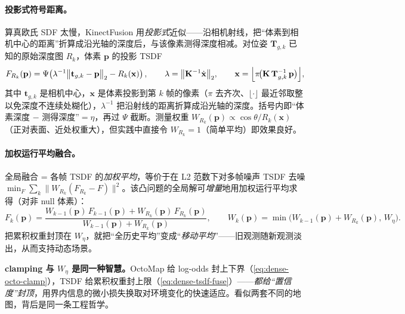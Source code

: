 \paragraph{投影式符号距离。}
算真欧氏 SDF 太慢，KinectFusion 用\emph{投影式}近似——沿相机射线，把“体素到相机中心的距离”折算成沿光轴的深度后，与该像素测得深度相减。对位姿 $\mathbf{T}_{g,k}$ 已知的原始深度图 $R_k$，体素 $\mathbf{p}$ 的投影 TSDF
\begin{equation}
  F_{R_k}(\mathbf{p})=\Psi\!\left(\lambda^{-1}\bigl\|\mathbf{t}_{g,k}-\mathbf{p}\bigr\|_2-R_k(\mathbf{x})\right),\qquad
  \lambda=\bigl\|\mathbf{K}^{-1}\dot{\mathbf{x}}\bigr\|_2,\qquad
  \mathbf{x}=\Bigl\lfloor \pi\!\bigl(\mathbf{K}\,\mathbf{T}_{g,k}^{-1}\,\mathbf{p}\bigr)\Bigr\rfloor,
  \label{eq:dense-tsdf-proj}
\end{equation}
其中 $\mathbf{t}_{g,k}$ 是相机中心，$\mathbf{x}$ 是体素投影到第 $k$ 帧的像素（$\pi$ 去齐次、$\lfloor\cdot\rfloor$ 最近邻取整以免深度不连续处糊化），$\lambda^{-1}$ 把沿射线的距离折算成沿光轴的深度。括号内即“体素深度 $-$ 测得深度”$=\eta$，再过 $\Psi$ 截断。测量权重 $W_{R_k}(\mathbf{p})\propto\cos\theta/R_k(\mathbf{x})$（正对表面、近处权重大），但实践中直接令 $W_{R_k}=1$（简单平均）即效果良好。

\paragraph{加权运行平均融合。}
全局融合 = 各帧 TSDF 的\emph{加权平均}，等价于在 L2 范数下对多帧噪声 TSDF 去噪 $\min_{F}\sum_k\|W_{R_k}(F_{R_k}-F)\|^2$。该凸问题的全局解可\emph{增量}地用加权运行平均求得（对非 null 体素）：
\begin{equation}
  F_k(\mathbf{p})=\frac{W_{k-1}(\mathbf{p})\,F_{k-1}(\mathbf{p})+W_{R_k}(\mathbf{p})\,F_{R_k}(\mathbf{p})}{W_{k-1}(\mathbf{p})+W_{R_k}(\mathbf{p})},\qquad
  W_k(\mathbf{p})=\min\!\bigl(W_{k-1}(\mathbf{p})+W_{R_k}(\mathbf{p}),\,W_\eta\bigr).
  \label{eq:dense-tsdf-fuse}
\end{equation}
把累积权重封顶在 $W_\eta$，就把“全历史平均”变成“\emph{移动平均}”——旧观测随新观测淡出，从而支持动态场景。

\begin{insight}
\textbf{clamping 与 $W_\eta$ 是同一种智慧。}OctoMap 给 log-odds 封上下界（\cref{eq:dense-octo-clamp}），TSDF 给累积权重封上限（\cref{eq:dense-tsdf-fuse}）——\emph{都给“置信度”封顶}，用界内信息的微小损失换取对环境变化的快速适应。看似两套不同的地图，背后是同一条工程哲学。
\end{insight}


